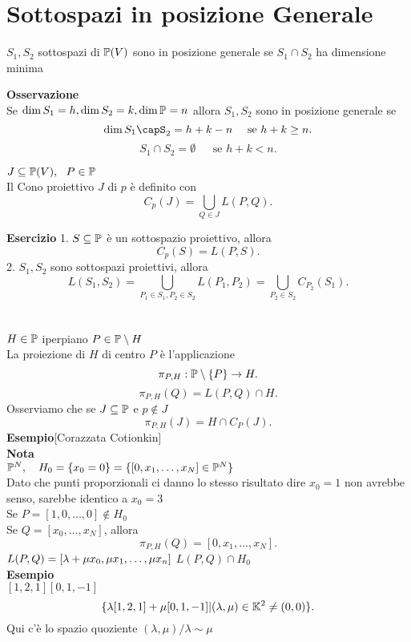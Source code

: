\documentclass[12px]{article}
\begin{document}
	\section{Sottospazi in posizione Generale}
	\begin{defi}
		$S_1, S_2$ sottospazi di $\mathbb{P}(V)$ sono in posizione generale se $S_1\cap S_2$ ha dimensione minima
	\end{defi}
	\textbf{Osservazione}\\
	Se $\dim S_1 = h, \dim S_2 = k, \dim\mathbb{P} =n$ allora $S_1,S_2$ sono in posizione generale se 
	\[
		\dim S_1\capS_2 = h + k - n \ \ \ \ \text{se } h+k\geq n
	.\]\[
	S_1\cap S_2 = \emptyset \ \ \ \ \ \ \ \text{se } h + k <n
.\]
\begin{defi}
$J\subseteq\mathbb{P}(V), \ \ P\in \mathbb{P}$\\
Il Cono proiettivo  $J$ di $p$ è definito con 
\[
	C_p(J) = \bigcup_{Q\in J}L(P,Q)
.\] 
\end{defi}
\textbf{Esercizio}
1. $S\subseteq\mathbb{P}$ è un sottospazio proiettivo, allora 
\[
 C_p(S) = L(P,S) 
.\] 
2. $S_1, S_2$ sono sottospazi proiettivi, allora 
\[
	L(S_1,S_2) = \bigcup_{P_1\in S_1, P_2\in S_2} L(P_1,P_2) = \bigcup_{P_2\in S_2} C_{P_2}(S_1)
.\] 
\ \\ \hline \ \\
$H\in \mathbb{P}$ iperpiano $P\in \mathbb{P}\setminus H$\\
La proiezione di  $H$ di centro $P$ è l'applicazione
\[
	\pi_{P,H}:\mathbb{P}\setminus\{P\} \rightarrow H
.\] 
\[
	\pi_{P,H}(Q) = L(P,Q) \cap H
.\] 
Osserviamo che se $J\subseteq \mathbb{P}$ e $p\notin J$
 \[
	 \pi_{P,H}(J) = H\cap C_P(J)
.\] 
\textbf{Esempio}[Corazzata Cotionkin]\\
\textbf{Nota}\\
$\mathbb{P}^N, \ \ \ H_0 = \{x_0=0\} = \{[0,x_1,\ldots,x_N]\in \mathbb{P}^N\}$\\
Dato che punti proporzionali ci danno lo stesso risultato dire $x_0 = 1$ non avrebbe senso, sarebbe identico a $x_0=3$\\[10px]
Se $P = [1,0,\ldots,0]\notin H_0$\\
Se $Q = [x_0,\ldots,x_N]$, allora
\[
	\pi_{P,H}(Q) = [0,x_1,\ldots,x_N]
.\] 
$L(P,Q) = [ \lambda + \mu x_0, \mu x_1,\ldots, \mu x_n]\\$
$L(P,Q)\cap H_0$\\
\textbf{Esempio}\\
$[1,2,1] [0,1,-1]$\\
\[
	\{ \lambda [1,2,1] + \mu [0,1,-1] | ( \lambda,\mu)\in \mathbb{K}^2 \neq(0,0)\}
.\] 
Qui c'è lo spazio quoziente $( \lambda,\mu) / \lambda \sim \mu $
\ \\ \hline \ \\ 
\end{document}
